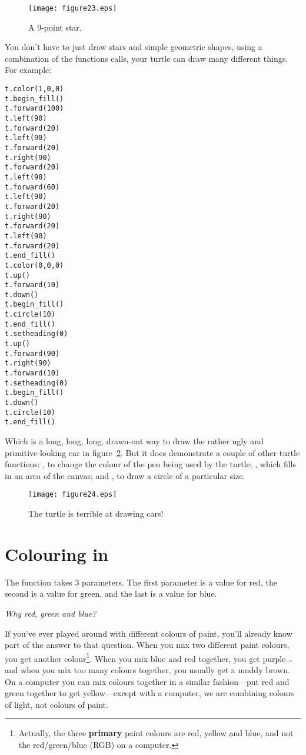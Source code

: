 \begin{figure}
\begin{center}
\texttt{[image: figure23.eps]}
\end{center}
\caption{A 9-point star.}\label{fig23}
\end{figure}

You don't have to just draw stars and simple geometric shapes, using a combination of the functions calls, your turtle can draw many different things.  For example:

\begin{Verbatim}[frame=single]
t.color(1,0,0)
t.begin_fill()
t.forward(100)
t.left(90)
t.forward(20)
t.left(90)
t.forward(20)
t.right(90)
t.forward(20)
t.left(90)
t.forward(60)
t.left(90)
t.forward(20)
t.right(90)
t.forward(20)
t.left(90)
t.forward(20)
t.end_fill()
t.color(0,0,0)
t.up()
t.forward(10)
t.down()
t.begin_fill()
t.circle(10)
t.end_fill()
t.setheading(0)
t.up()
t.forward(90)
t.right(90)
t.forward(10)
t.setheading(0)
t.begin_fill()
t.down()
t.circle(10)
t.end_fill()
\end{Verbatim}

\noindent
Which is a long, long, long, drawn-out way to draw the rather ugly and primitive-looking car in figure~\ref{fig24}. But it does demonstrate a couple of other turtle functions:  , to change the colour of the pen being used by the turtle; , which fills in an area of the canvas; and , to draw a circle of a particular size.

\begin{figure}
\begin{center}
\texttt{[image: figure24.eps]}
\end{center}
\caption{The turtle is terrible at drawing cars!}\label{fig24}
\end{figure}

\section{Colouring in}

The  function takes 3 parameters. The first parameter is a value for red, the second is a value for green, and the last is a value for blue.
\par
\emph{Why red, green and blue?}
\par
If you've ever played around with different colours of paint, you'll already know part of the answer to that question.  When you mix two different paint colours, you get another colour\footnote{Actually, the three \textbf{primary} paint colours are red, yellow and blue, and not the red/green/blue (RGB) on a computer.}.  When you mix blue and red together, you get purple$\ldots$ and when you mix too many colours together, you usually get a muddy brown. On a computer you can mix colours together in a similar fashion---put red and green together to get yellow---except with a computer, we are combining colours of light, not colours of paint.

